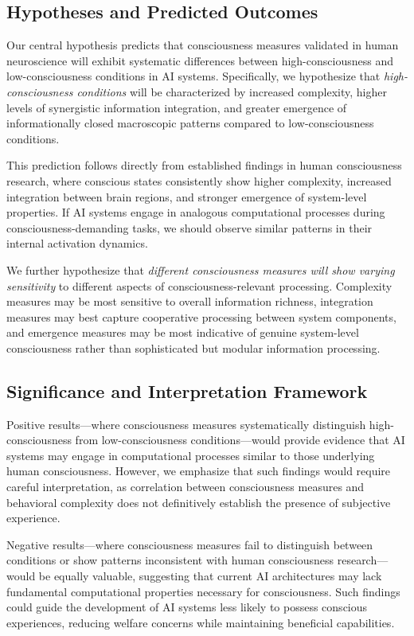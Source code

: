 \documentclass[11pt,a4paper]{article}
\begin{document}
\subsection{Hypotheses and Predicted Outcomes}

Our central hypothesis predicts that consciousness measures validated in human neuroscience will exhibit systematic differences between high-consciousness and low-consciousness conditions in AI systems. Specifically, we hypothesize that \textit{high-consciousness conditions} will be characterized by increased complexity, higher levels of synergistic information integration, and greater emergence of informationally closed macroscopic patterns compared to low-consciousness conditions.

This prediction follows directly from established findings in human consciousness research, where conscious states consistently show higher complexity, increased integration between brain regions, and stronger emergence of system-level properties. If AI systems engage in analogous computational processes during consciousness-demanding tasks, we should observe similar patterns in their internal activation dynamics.

We further hypothesize that \textit{different consciousness measures will show varying sensitivity} to different aspects of consciousness-relevant processing. Complexity measures may be most sensitive to overall information richness, integration measures may best capture cooperative processing between system components, and emergence measures may be most indicative of genuine system-level consciousness rather than sophisticated but modular information processing.

\subsection{Significance and Interpretation Framework}

Positive results—where consciousness measures systematically distinguish high-consciousness from low-consciousness conditions—would provide evidence that AI systems may engage in computational processes similar to those underlying human consciousness. However, we emphasize that such findings would require careful interpretation, as correlation between consciousness measures and behavioral complexity does not definitively establish the presence of subjective experience.

Negative results—where consciousness measures fail to distinguish between conditions or show patterns inconsistent with human consciousness research—would be equally valuable, suggesting that current AI architectures may lack fundamental computational properties necessary for consciousness. Such findings could guide the development of AI systems less likely to possess conscious experiences, reducing welfare concerns while maintaining beneficial capabilities.
\end{document}
